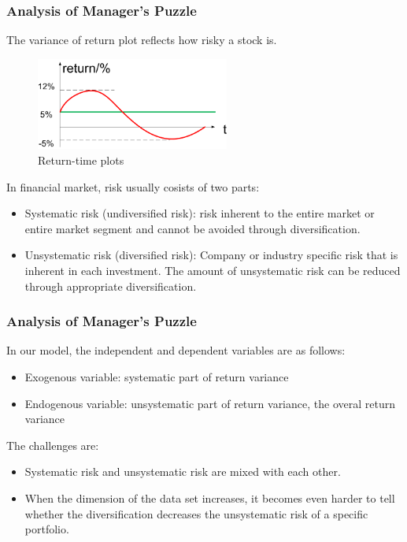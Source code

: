 \documentclass[compress,handout,10pt]{beamer}
\let\olditem\item
\renewcommand{\item}{\setlength{\itemsep}{0.5\baselineskip}\olditem}
\begin{document}
\begin{frame}
    \frametitle{Analysis of Manager's Puzzle}
The variance of return plot reflects how risky a stock is.\\
\begin{figure}[h]
    \begin{center}
        \includegraphics[width=2.5in]{images/6.png}
    \end{center}
    \caption{Return-time plots}
    \label{fig:RP}
\end{figure}
In financial market, risk usually cosists of two parts:
\vspace{7pt}    
\begin{itemize}
 \item  Systematic risk (undiversified risk): risk inherent to the entire market or entire market segment and  cannot be avoided through diversification.
\item  Unsystematic risk (diversified risk): Company or industry specific risk that is inherent in each investment. The amount of unsystematic risk can be reduced through appropriate diversification. 
\end{itemize} 
\end{frame}

\begin{frame}
\frametitle{Analysis of Manager's Puzzle}
In our model, the independent and dependent variables are as follows:
\begin{itemize}
\item Exogenous variable: systematic part of return variance
\item Endogenous variable: unsystematic part of return variance, the overal return variance
\end{itemize}

The challenges are:
\begin{itemize}
\item Systematic risk and unsystematic risk are mixed with each other. 
\item When the dimension of the data set increases, it becomes even harder to tell whether the diversification decreases the unsystematic risk of a specific portfolio.
\end{itemize}
\end{frame}
\end{document}
